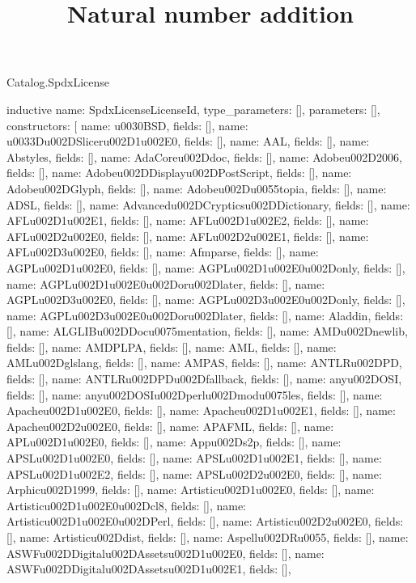 \begin{lexlean}{Catalog.SpdxLicense}
\title{Natural number addition}
\begin{semanticmodule}
inductive{
  name: SpdxLicenseLicenseId,
  type_parameters: [],
  parameters: [],
  constructors: [
    {name: u0030BSD, fields: []},
    {name: u0033Du002DSliceru002D1u002E0, fields: []},
    {name: AAL, fields: []},
    {name: Abstyles, fields: []},
    {name: AdaCoreu002Ddoc, fields: []},
    {name: Adobeu002D2006, fields: []},
    {name: Adobeu002DDisplayu002DPostScript, fields: []},
    {name: Adobeu002DGlyph, fields: []},
    {name: Adobeu002Du0055topia, fields: []},
    {name: ADSL, fields: []},
    {name: Advancedu002DCrypticsu002DDictionary, fields: []},
    {name: AFLu002D1u002E1, fields: []},
    {name: AFLu002D1u002E2, fields: []},
    {name: AFLu002D2u002E0, fields: []},
    {name: AFLu002D2u002E1, fields: []},
    {name: AFLu002D3u002E0, fields: []},
    {name: Afmparse, fields: []},
    {name: AGPLu002D1u002E0, fields: []},
    {name: AGPLu002D1u002E0u002Donly, fields: []},
    {name: AGPLu002D1u002E0u002Doru002Dlater, fields: []},
    {name: AGPLu002D3u002E0, fields: []},
    {name: AGPLu002D3u002E0u002Donly, fields: []},
    {name: AGPLu002D3u002E0u002Doru002Dlater, fields: []},
    {name: Aladdin, fields: []},
    {name: ALGLIBu002DDocu0075mentation, fields: []},
    {name: AMDu002Dnewlib, fields: []},
    {name: AMDPLPA, fields: []},
    {name: AML, fields: []},
    {name: AMLu002Dglslang, fields: []},
    {name: AMPAS, fields: []},
    {name: ANTLRu002DPD, fields: []},
    {name: ANTLRu002DPDu002Dfallback, fields: []},
    {name: anyu002DOSI, fields: []},
    {name: anyu002DOSIu002Dperlu002Dmodu0075les, fields: []},
    {name: Apacheu002D1u002E0, fields: []},
    {name: Apacheu002D1u002E1, fields: []},
    {name: Apacheu002D2u002E0, fields: []},
    {name: APAFML, fields: []},
    {name: APLu002D1u002E0, fields: []},
    {name: Appu002Ds2p, fields: []},
    {name: APSLu002D1u002E0, fields: []},
    {name: APSLu002D1u002E1, fields: []},
    {name: APSLu002D1u002E2, fields: []},
    {name: APSLu002D2u002E0, fields: []},
    {name: Arphicu002D1999, fields: []},
    {name: Artisticu002D1u002E0, fields: []},
    {name: Artisticu002D1u002E0u002Dcl8, fields: []},
    {name: Artisticu002D1u002E0u002DPerl, fields: []},
    {name: Artisticu002D2u002E0, fields: []},
    {name: Artisticu002Ddist, fields: []},
    {name: Aspellu002DRu0055, fields: []},
    {name: ASWFu002DDigitalu002DAssetsu002D1u002E0, fields: []},
    {name: ASWFu002DDigitalu002DAssetsu002D1u002E1, fields: []},
}
\end{semanticmodule}
\end{lexlean}
